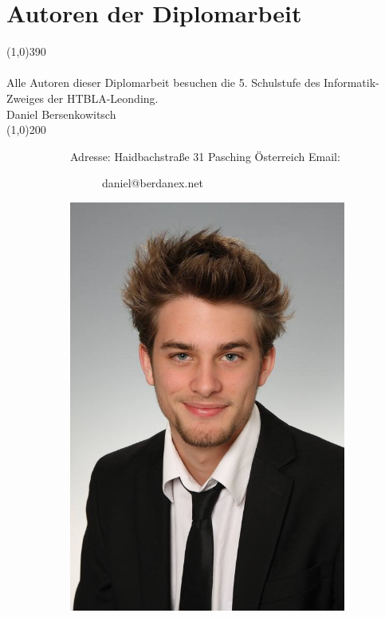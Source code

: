 \documentclass[FIPLY_base.tex]{subfiles}
\begin{document}
	\section{Autoren der Diplomarbeit}
	\line(1,0){390}
	\ \\
	\ \\
	Alle Autoren dieser Diplomarbeit besuchen die 5. Schulstufe des Informatik-Zweiges der HTBLA-Leonding.
	\ \\
	\newline\newline
	{\Large Daniel Bersenkowitsch}
	\ \\
	\line(1,0){200}
	\begin{figure}[H]
		\begin{subfigure}[b]{0.3\textwidth}
			Adresse: \newline
			Haidbachstraße 31  Pasching \newline
			Österreich \newline
			\newline
			Email:
			\begin{subfigure}[b]{0.2\textwidth}
				daniel@berdanex.net
			\end{subfigure}
		\end{subfigure}
		\hfil
		\begin{subfigure}[b]{0.2\textwidth}
			\includegraphics[scale=0.1]{img/dani}
		\end{subfigure}
	\end{figure}
\end{document}
